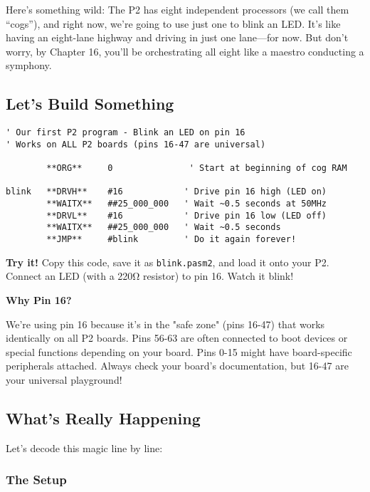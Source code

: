 \documentclass[11pt]{book}
\newcommand{\passthrough}[1]{#1}
\begin{document}
Here's something wild: The P2 has eight independent processors (we call
them ``cogs''), and right now, we're going to use just one to blink an
LED. It's like having an eight-lane highway and driving in just one
lane---for now. But don't worry, by Chapter 16, you'll be orchestrating
all eight like a maestro conducting a symphony.

\hypertarget{lets-build-something}{%
\subsection{Let's Build Something}\label{lets-build-something}}

\begin{lstlisting}
' Our first P2 program - Blink an LED on pin 16
' Works on ALL P2 boards (pins 16-47 are universal)

        **ORG**     0               ' Start at beginning of cog RAM
        
blink   **DRVH**    #16            ' Drive pin 16 high (LED on)
        **WAITX**   ##25_000_000   ' Wait ~0.5 seconds at 50MHz
        **DRVL**    #16            ' Drive pin 16 low (LED off)  
        **WAITX**   ##25_000_000   ' Wait ~0.5 seconds
        **JMP**     #blink         ' Do it again forever!
\end{lstlisting}

\textbf{Try it!} Copy this code, save it as
\passthrough{\lstinline!blink.pasm2!}, and load it onto your P2. Connect
an LED (with a 220Ω resistor) to pin 16. Watch it blink!

\begin{sidetrack}
\textbf{Why Pin 16?}

We're using pin 16 because it's in the "safe zone" (pins 16-47) that works identically on all P2 boards. Pins 56-63 are often connected to boot devices or special functions depending on your board. Pins 0-15 might have board-specific peripherals attached. Always check your board's documentation, but 16-47 are your universal playground!
\end{sidetrack}

\hypertarget{whats-really-happening}{%
\subsection{What's Really Happening}\label{whats-really-happening}}

Let's decode this magic line by line:

\hypertarget{the-setup}{%
\subsubsection{The Setup}\label{the-setup}}
\end{document}
